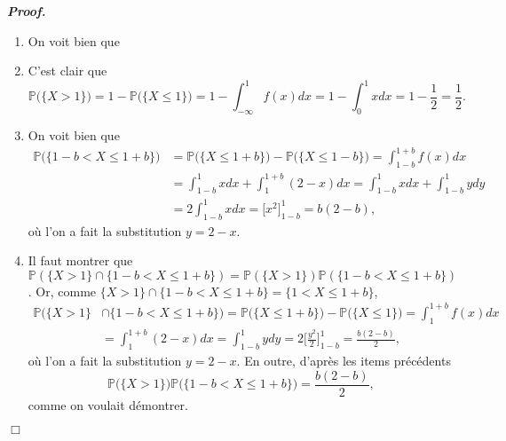 \documentclass[11pt,a4paper]{article}
\newenvironment{preuve}[1][]
{\vskip 2mm  \noindent\emph{\bf Proof#1. }}{$\Box$ \vskip 2mm}
\let\leq\leqslant
\begin{document}
		\begin{preuve} 
			\begin{enumerate}
				\item On voit bien que 
				
				
				\item C'est clair que 
				\[     \mathbb{P}\big(\{X>1\}\big) = 1 - \mathbb{P}\big(\{X\leq1\}\big) = 1 - \int_{- \infty}^{1} f(x) dx = 1 - \int_{0}^{1} x dx = 1 - \frac{1}{2} = \frac{1}{2}.     \]
				
				\item On voit bien que 
				\begin{align*}
				\mathbb{P}\big(\{1-b < X \leq 1 + b \}\big) &= \mathbb{P}\big(\{X\leq1+b\}\big) - \mathbb{P}\big(\{X\leq1-b\}\big) = \int_{1-b}^{1+b} f(x) dx 
				\\ 
				&= \int_{1-b}^{1} x dx + \int_{1}^{1+b} (2-x) dx = \int_{1-b}^{1} x dx + \int_{1-b}^{1} y dy 
				\\
				&= 2 \int_{1-b}^{1} x dx = \bigg[ x^{2} \bigg]_{1-b}^{1} = b(2-b),
				\end{align*}          
				où l'on a fait la substitution $y = 2 - x$.
				
				\item Il faut montrer que $\mathbb{P}(\{X >1 \} \cap \{1-b<X\leq 1+b\}) = \mathbb{P}(\{X >1 \}) \mathbb{P}(\{1-b<X\leq 1+b\})$. 
				Or, comme $\{X >1 \} \cap \{1-b<X\leq 1+b\} = \{1<X\leq 1+b\}$, 
				\begin{align*}
				\mathbb{P}\big(\{X >1 \} &\cap \{1-b<X\leq 1+b\}\big) = \mathbb{P}\big(\{X\leq1+b\}\big) - \mathbb{P}\big(\{X\leq1 \}\big) 
				= \int_{1}^{1+b} f(x) dx
				\\
				&= \int_{1}^{1+b} (2-x) dx = \int_{1-b}^{1} y dy = 2 \bigg[ \frac{y^{2}}{2} \bigg]_{1-b}^{1} = \frac{b(2-b)}{2},
				\end{align*}
				où l'on a fait la substitution $y = 2 - x$. 
				En outre, d'après les items précédents 
				\[     \mathbb{P}\big(\{X >1 \}\big) \mathbb{P}\big(\{1-b<X\leq 1+b\}\big) = \frac{b(2-b)}{2},     \]
				comme on voulait démontrer. 
			\end{enumerate}
		\end{preuve} 
		
\end{document}
